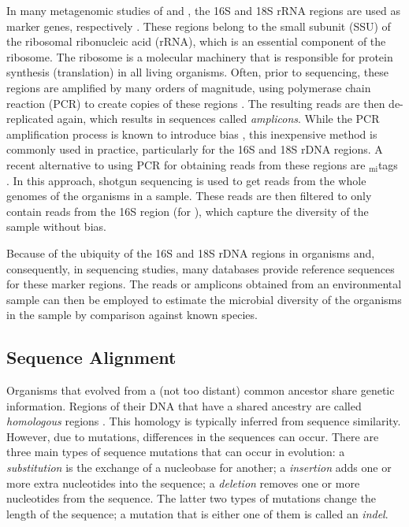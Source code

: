 In many metagenomic studies of  and ,
the 16S \cite{Weisburg1991} and 18S \cite{Meyer2010} rRNA regions are used as marker genes,
respectively \cite{Woese1977,Woese1990}.
These regions belong to the small subunit (SSU) of the ribosomal ribonucleic acid (rRNA),
which is an essential component of the ribosome.
The ribosome is a molecular machinery that is responsible for protein synthesis (translation) in all living organisms.
Often, prior to sequencing, these regions are amplified by many orders of magnitude,
using polymerase chain reaction (PCR) to create copies of these regions \cite{Bartlett2003}.
The resulting reads are then de-replicated again, which results in sequences called \emph{amplicons}.
While the PCR amplification process is known to introduce bias \cite{Logares2014,Brown2017},
this inexpensive method is commonly used in practice, particularly for the 16S and 18S rDNA regions.
A recent alternative to using PCR for obtaining reads from these regions are $_{\text{mi}}$tags \citep{Logares2014}.
In this approach, shotgun sequencing is used to get reads from the whole genomes of the organisms in a sample.
These reads are then filtered to only contain reads from the 16S region (for ),
which capture the diversity of the sample without bias.

Because of the ubiquity of the 16S and 18S rDNA regions in organisms and, consequently, in sequencing studies,
many databases provide reference sequences for these marker regions.
The reads or amplicons obtained from an environmental sample can then be employed
to estimate the microbial diversity of the organisms in the sample by comparison against known species.


\subsection{Sequence Alignment}
\label{ch:Foundations:sec:SequenceAnalysis:sub:SequenceAlignment}

Organisms that evolved from a (not too distant) common ancestor share genetic information.
Regions of their DNA that have a shared ancestry are called \emph{homologous} regions \cite{Koonin2005}.
This homology is typically inferred from sequence similarity. %
However, due to mutations, differences in the sequences can occur.
There are three main types of sequence mutations that can occur in evolution:
a \emph{substitution} is the exchange of a nucleobase for another;
a \emph{insertion} adds one or more extra nucleotides into the sequence;
a \emph{deletion} removes one or more nucleotides from the sequence.
The latter two types of mutations change the length of the sequence;
a mutation that is either one of them is called an \emph{indel}.

